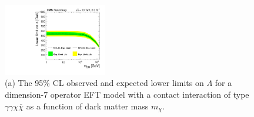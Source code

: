 
\begin{figure}[htb!]
\caption[Expected lower limit for EFT cutoff parameter $\Lambda$]{(a) The 95\% CL observed and expected lower limits on $\Lambda$ for a dimension-7 operator EFT model with a contact interaction of type $\gamma\gamma\chi\overline{\chi}$ as a function of dark matter mass $m_{\chi}$.}\label{fig:DMEWKlimits}
\begin{center}
\includegraphics[width=0.4\textwidth]{pdfs/lgxc/fromb/EWK_lambda.pdf}
\end{center}
\end{figure}





